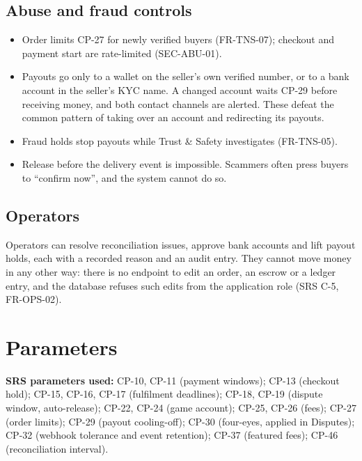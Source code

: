 \documentclass[11pt,a4paper]{article}
\begin{document}
\subsection{Abuse and fraud controls}
\begin{itemize}[nosep]
  \item Order limits CP-27 for newly verified buyers (FR-TNS-07); checkout and payment start are rate-limited (SEC-ABU-01).
  \item Payouts go only to a wallet on the seller's own verified number, or to a bank account in the seller's KYC name. A changed account waits CP-29 before receiving money, and both contact channels are alerted. These defeat the common pattern of taking over an account and redirecting its payouts.
  \item Fraud holds stop payouts while Trust \& Safety investigates (FR-TNS-05).
  \item Release before the delivery event is impossible. Scammers often press buyers to ``confirm now'', and the system cannot do so.
\end{itemize}

\subsection{Operators}
Operators can resolve reconciliation issues, approve bank accounts and lift payout holds, each with a recorded reason and an audit entry. They cannot move money in any other way: there is no endpoint to edit an order, an escrow or a ledger entry, and the database refuses such edits from the application role (SRS C-5, FR-OPS-02).

\section{Parameters}
\textbf{SRS parameters used:} CP-10, CP-11 (payment windows); CP-13 (checkout hold); CP-15, CP-16, CP-17 (fulfilment deadlines); CP-18, CP-19 (dispute window, auto-release); CP-22, CP-24 (game account); CP-25, CP-26 (fees); CP-27 (order limits); CP-29 (payout cooling-off); CP-30 (four-eyes, applied in Disputes); CP-32 (webhook tolerance and event retention); CP-37 (featured fees); CP-46 (reconciliation interval).
\end{document}
